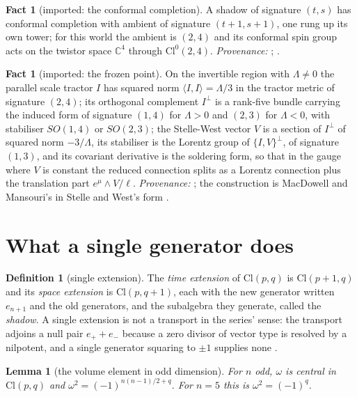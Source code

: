 \documentclass[11pt]{article}
\newtheorem{lemma}[theorem]{Lemma}
\theoremstyle{definition}
\newtheorem{definition}[theorem]{Definition}
\newtheorem{fact}[theorem]{Fact}
\newcommand{\Cl}{\mathrm{Cl}}
\newcommand{\C}{\mathbb{C}}
\newcommand{\ip}[2]{\langle #1, #2\rangle}
\begin{document}
\begin{fact}[imported: the conformal completion]\label{fact:conformal}
A shadow of signature $(t,s)$ has conformal completion with ambient of signature $(t+1, s+1)$, one rung up its own tower; for this world the ambient is $(2,4)$ and its conformal spin group acts on the twistor space $\C^{4}$ through $\Cl^{0}(2,4)$. \emph{Provenance:} \cite[Fact~2.1, Thm.~3.4]{ButlerT9}; \cite[Fact~2.11]{ButlerT12}.
\end{fact}

\begin{fact}[imported: the frozen point]\label{fact:frozen}
On the invertible region with $\Lambda \neq 0$ the parallel scale tractor $I$ has squared norm $\ip{I}{I} = \Lambda/3$ in the tractor metric of signature $(2,4)$; its orthogonal complement $I^{\perp}$ is a rank-five bundle carrying the induced form of signature $(1,4)$ for $\Lambda > 0$ and $(2,3)$ for $\Lambda < 0$, with stabiliser $SO(1,4)$ or $SO(2,3)$; the Stelle-West vector $V$ is a section of $I^{\perp}$ of squared norm $-3/\Lambda$, its stabiliser is the Lorentz group of $\{I, V\}^{\perp}$, of signature $(1,3)$, and its covariant derivative is the soldering form, so that in the gauge where $V$ is constant the reduced connection splits as a Lorentz connection plus the translation part $e^{\mu}\wedge V/\ell$. \emph{Provenance:} \cite[Fact~2.1, Thm.~3.1]{ButlerT10}; the construction is MacDowell and Mansouri's \cite{MacDowellMansouri1977} in Stelle and West's form \cite{StelleWest1980}.
\end{fact}

\section{What a single generator does}\label{sec:single}

\begin{definition}[single extension]\label{def:single}
The \emph{time extension} of $\Cl(p,q)$ is $\Cl(p+1, q)$ and its \emph{space extension} is $\Cl(p, q+1)$, each with the new generator written $e_{n+1}$ and the old generators, and the subalgebra they generate, called the \emph{shadow}. A single extension is not a transport in the series' sense: the transport adjoins a null pair $e_{+} + e_{-}$ because a zero divisor of vector type is resolved by a nilpotent, and a single generator squaring to $\pm 1$ supplies none \cite[\S 8]{ButlerT1}.
\end{definition}

\begin{lemma}[the volume element in odd dimension]\label{lem:omega}
For $n$ odd, $\omega$ is central in $\Cl(p,q)$ and $\omega^{2} = (-1)^{n(n-1)/2 + q}$. For $n = 5$ this is $\omega^{2} = (-1)^{q}$.
\end{lemma}
\end{document}

